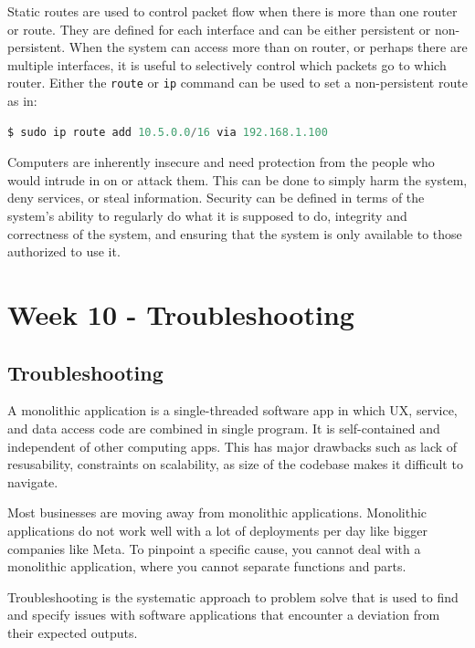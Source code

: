 \documentclass[11pt]{article}
\begin{document}
\noindent Static routes are used to control packet flow when there is more than one router or route. They are defined for each interface and can be either persistent or non-persistent. When the system can access more than on router, or perhaps there are multiple interfaces, it is useful to selectively control which packets go to which router. Either the \texttt{route} or \texttt{ip} command can be used to set a non-persistent route as in:

\begin{lstlisting}[language=python]
$ sudo ip route add 10.5.0.0/16 via 192.168.1.100
\end{lstlisting}


\noindent Computers are inherently insecure and need protection from the people who would intrude in on or attack them. This can be done to simply harm the system, deny services, or steal information. Security can be defined in terms of the system's ability to regularly do what it is supposed to do, integrity and correctness of the system, and ensuring that the system is only available to those authorized to use it.


\section*{Week 10 - Troubleshooting}
\subsection*{Troubleshooting}
A monolithic application is a single-threaded software app in which
UX, service, and data access code are combined in single program. It is self-contained and independent of other computing apps. This has major drawbacks such as lack of resusability, constraints on scalability, as size of the codebase makes it difficult to navigate.

\noindent Most businesses are moving away from monolithic applications. Monolithic applications do not work well with a lot of deployments per day like bigger companies like Meta. To pinpoint a specific cause, you cannot deal with a monolithic application, where you cannot separate functions and parts.

\noindent Troubleshooting is the systematic approach to problem solve that is used to find and specify issues with software applications that encounter a deviation from their expected outputs.
\end{document}
